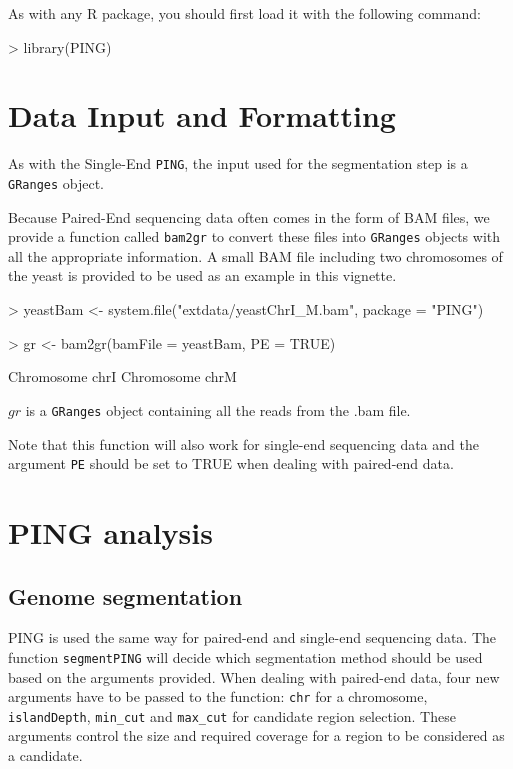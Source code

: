 \documentclass[11pt]{article}
\begin{document}
As with any R package, you should first load it with the following command:

\begin{Schunk}
\begin{Sinput}
> library(PING)
\end{Sinput}
\end{Schunk}

\section{Data Input and Formatting}
As with the Single-End \texttt{PING}, the input used for the segmentation step is a \texttt{GRanges} object.

Because Paired-End sequencing data often comes in the form of BAM files, we provide a function called \texttt{bam2gr} to convert these files into \texttt{GRanges} objects with all the appropriate information.
A small BAM file including two chromosomes of the yeast is provided to be used as an example in this vignette.

\begin{Schunk}
\begin{Sinput}
> yeastBam <- system.file("extdata/yeastChrI_M.bam", package = "PING")
\end{Sinput}
\end{Schunk}

\begin{Schunk}
\begin{Sinput}
> gr <- bam2gr(bamFile = yeastBam, PE = TRUE)
\end{Sinput}
\begin{Soutput}
Chromosome  chrI 
Chromosome  chrM 
\end{Soutput}
\end{Schunk}
$gr$ is a \texttt{GRanges} object containing all the reads from the .bam file. 

Note that this function will also work for single-end sequencing data and the argument \texttt{PE} should be set to TRUE when dealing with paired-end data.


\section{PING analysis}

\subsection{Genome segmentation}
PING is used the same way for paired-end and single-end sequencing data. The
function \texttt{segmentPING} will decide which segmentation method should be
used based on the arguments provided. 
When dealing with paired-end data, four new arguments have to be passed to the
function: \texttt{chr} for a chromosome, \texttt{islandDepth}, \texttt{min_cut} 
and \texttt{max_cut} for candidate region selection. These arguments control the 
size and required coverage for a region to be considered as a candidate.
\end{document}
